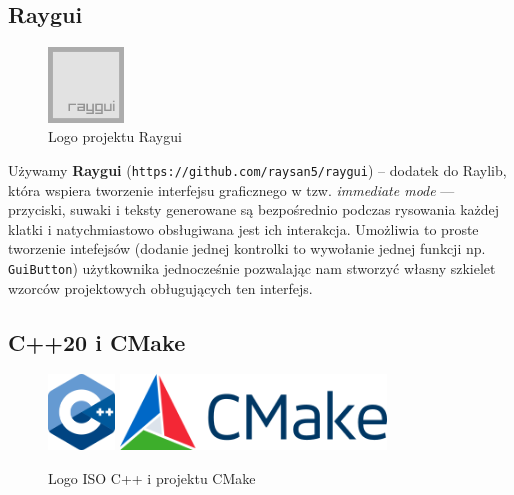 \documentclass[a4paper,12pt]{article}
\begin{document}
\subsection{Raygui} 

\begin{figure}[H]
\begin{center}
  \includegraphics[height=2cm]{figures/raygui_256x256.png} 
\end{center}
\caption{Logo projektu Raygui}
\end{figure}

Używamy \textbf{Raygui} (\verb|https://github.com/raysan5/raygui|) -- dodatek do Raylib, która wspiera tworzenie interfejsu
graficznego w tzw. \emph{immediate mode} — przyciski, suwaki i teksty
generowane są bezpośrednio podczas rysowania każdej klatki i natychmiastowo
obsługiwana jest ich interakcja. Umożliwia to proste tworzenie intefejsów
(dodanie jednej kontrolki to wywołanie jednej funkcji np. \texttt{GuiButton})
użytkownika jednocześnie pozwalając nam stworzyć własny szkielet wzorców
projektowych obługujących ten interfejs.

\subsection{C++20 i CMake}

\begin{figure}[H]
\begin{center}
  \includegraphics[height=2cm]{figures/ISO_C++_Logo.png} 
  \hspace{1cm}
  \includegraphics[height=2cm]{figures/CMake-Logo-1.png} 
\end{center}
\caption{Logo ISO C++ i projektu CMake}
\end{figure}
\end{document}
